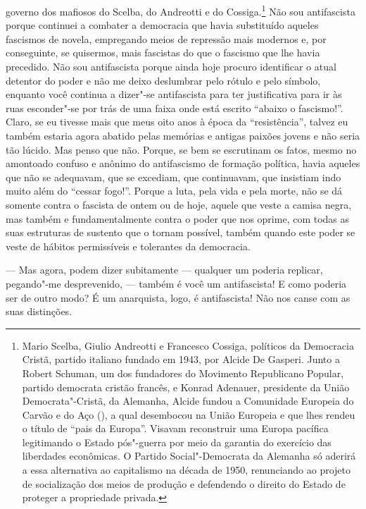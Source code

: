 \noindent{}governo dos mafiosos do Scelba, do
Andreotti e do Cossiga.\footnote{Mario Scelba, Giulio Andreotti e Francesco Cossiga, políticos da
  Democracia Cristã, partido italiano fundado em 1943, por Alcide De
  Gasperi. Junto a Robert Schuman, um dos fundadores do Movimento
  Republicano Popular, partido democrata cristão francês, e Konrad
  Adenauer, presidente da União Democrata"-Cristã, da Alemanha, Alcide
  fundou a Comunidade Europeia do Carvão e do Aço (), a qual
  desembocou na União Europeia e que lhes rendeu o título de ``pais da
  Europa''. Visavam reconstruir uma Europa pacífica legitimando o Estado
  pós"-guerra por meio da garantia do exercício das liberdades
  econômicas. O Partido Social"-Democrata da Alemanha só aderirá a essa
  alternativa ao capitalismo na década de 1950, renunciando ao projeto
  de socialização dos meios de produção e defendendo o direito do Estado
  de proteger a propriedade privada.} Não sou antifascista porque continuei a combater a
democracia que havia substituído aqueles fascismos de novela, empregando
meios de repressão mais modernos e, por conseguinte, se quisermos, mais
fascistas do que o fascismo que lhe havia precedido. Não sou
antifascista porque ainda hoje procuro identificar o atual detentor do
poder e não me deixo deslumbrar pelo rótulo e pelo símbolo, enquanto
você continua a dizer"-se antifascista para ter justificativa para ir às
ruas esconder"-se por trás de uma faixa onde está escrito ``abaixo o
fascismo!''. Claro, se eu tivesse mais que meus oito anos à época da
``resistência'', talvez eu também estaria agora abatido pelas memórias e
antigas paixões jovens e não seria tão lúcido. Mas penso que não.
Porque, se bem se escrutinam os fatos, mesmo no amontoado confuso e
anônimo do antifascismo de formação política, havia aqueles que não se
adequavam, que se excediam, que continuavam, que insistiam indo muito
além do ``cessar fogo!''. Porque a luta, pela vida e pela morte, não se
dá somente contra o fascista de ontem ou de hoje, aquele que veste a
camisa negra, mas também e fundamentalmente contra o poder que nos
oprime, com todas as suas estruturas de sustento que o tornam possível,
também quando este poder se veste de hábitos permissíveis e tolerantes
da democracia.

--- Mas agora, podem dizer subitamente --- qualquer um poderia replicar,
pegando"-me desprevenido, --- também é você um antifascista! E como
poderia ser de outro modo? É um anarquista, logo, é antifascista! Não
nos canse com as suas distinções.

